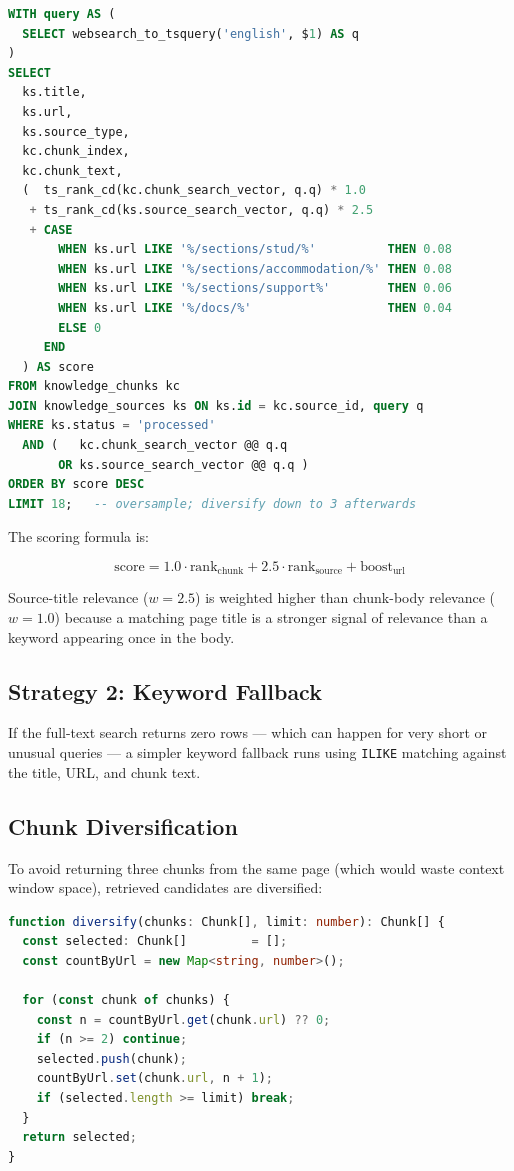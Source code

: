 \documentclass[12pt,a4paper]{report}
\begin{document}
\begin{lstlisting}[language=sql, caption=Full-text search query with composite scoring]
WITH query AS (
  SELECT websearch_to_tsquery('english', $1) AS q
)
SELECT
  ks.title,
  ks.url,
  ks.source_type,
  kc.chunk_index,
  kc.chunk_text,
  (  ts_rank_cd(kc.chunk_search_vector, q.q) * 1.0
   + ts_rank_cd(ks.source_search_vector, q.q) * 2.5
   + CASE
       WHEN ks.url LIKE '%/sections/stud/%'          THEN 0.08
       WHEN ks.url LIKE '%/sections/accommodation/%' THEN 0.08
       WHEN ks.url LIKE '%/sections/support%'        THEN 0.06
       WHEN ks.url LIKE '%/docs/%'                   THEN 0.04
       ELSE 0
     END
  ) AS score
FROM knowledge_chunks kc
JOIN knowledge_sources ks ON ks.id = kc.source_id, query q
WHERE ks.status = 'processed'
  AND (   kc.chunk_search_vector @@ q.q
       OR ks.source_search_vector @@ q.q )
ORDER BY score DESC
LIMIT 18;   -- oversample; diversify down to 3 afterwards
\end{lstlisting}

The scoring formula is:

\begin{equation}
\text{score} = 1.0 \cdot \text{rank}_{\text{chunk}} + 2.5 \cdot \text{rank}_{\text{source}} + \text{boost}_{\text{url}}
\end{equation}

Source-title relevance ($w=2.5$) is weighted higher than chunk-body relevance ($w=1.0$) because a matching page title is a stronger signal of relevance than a keyword appearing once in the body.

\subsection{Strategy 2: Keyword Fallback}

If the full-text search returns zero rows --- which can happen for very short or unusual queries --- a simpler keyword fallback runs using \texttt{ILIKE} matching against the title, URL, and chunk text.

\subsection{Chunk Diversification}

To avoid returning three chunks from the same page (which would waste context window space), retrieved candidates are diversified:

\begin{lstlisting}[language=TypeScript, caption=Chunk diversification: max 2 per source URL]
function diversify(chunks: Chunk[], limit: number): Chunk[] {
  const selected: Chunk[]         = [];
  const countByUrl = new Map<string, number>();

  for (const chunk of chunks) {
    const n = countByUrl.get(chunk.url) ?? 0;
    if (n >= 2) continue;
    selected.push(chunk);
    countByUrl.set(chunk.url, n + 1);
    if (selected.length >= limit) break;
  }
  return selected;
}
\end{lstlisting}
\end{document}
